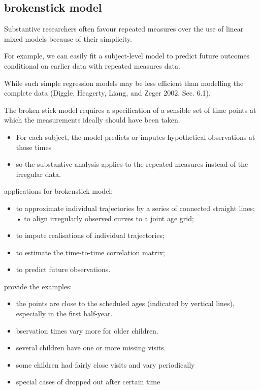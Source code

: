 \documentclass{article}
\providecommand{\tightlist}{%
  \setlength{\itemsep}{0pt}\setlength{\parskip}{0pt}}
\begin{document}
\hypertarget{brokenstick-model}{%
\subsection{brokenstick model}\label{brokenstick-model}}

Substantive researchers often favour repeated measures over the use of
linear mixed models because of their simplicity.

For example, we can easily fit a subject-level model to predict future
outcomes conditional on earlier data with repeated measures data.

While such simple regression models may be less efficient than modelling
the complete data (Diggle, Heagerty, Liang, and Zeger 2002, Sec. 6.1),

The broken stick model requires a specification of a sensible set of
time points at which the measurements ideally should have been taken.

\begin{itemize}
\item
  For each subject, the model predicts or imputes hypothetical
  observations at those times
\item
  so the substantive analysis applies to the repeated measures instead
  of the irregular data.
\end{itemize}

applications for brokenstick model:

\begin{itemize}
\tightlist
\item
  to approximate individual trajectories by a series of connected
  straight lines; • to align irregularly observed curves to a joint age
  grid;
\item
  to impute realisations of individual trajectories;
\item
  to estimate the time-to-time correlation matrix;
\item
  to predict future observations.
\end{itemize}

provide the examples:

\begin{itemize}
\item
  the points are close to the scheduled ages (indicated by vertical
  lines), especially in the first half-year.
\item
  bservation times vary more for older children.
\item
  several children have one or more missing visits.
\item
  some children had fairly close visits and vary periodically
\item
  special cases of dropped out after certain time
\end{itemize}
\end{document}
